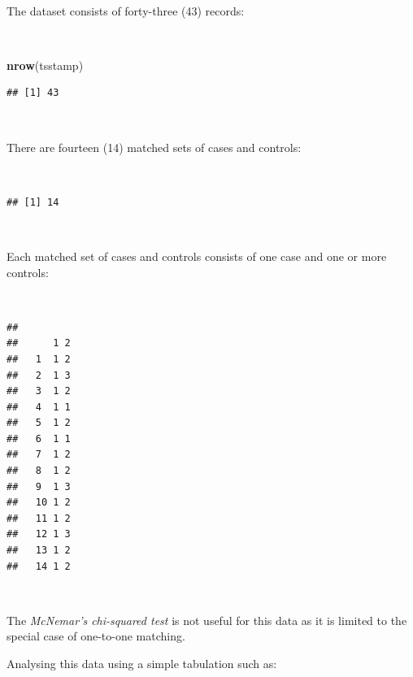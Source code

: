 \documentclass[12pt,a4paper]{book}
\newenvironment{Shaded}{\begin{snugshade}}{\end{snugshade}}
\newcommand{\KeywordTok}[1]{\textcolor[rgb]{0.13,0.29,0.53}{\textbf{#1}}}
\newcommand{\NormalTok}[1]{#1}
\newcommand{\OperatorTok}[1]{\textcolor[rgb]{0.81,0.36,0.00}{\textbf{#1}}}
\theoremstyle{definition}
\theoremstyle{definition}
\theoremstyle{definition}
\theoremstyle{remark}
\begin{document}
~

The dataset consists of forty-three (43) records:

~

\begin{Shaded}
\begin{Highlighting}[]
\KeywordTok{nrow}\NormalTok{(tsstamp)}
\end{Highlighting}
\end{Shaded}

\begin{verbatim}
## [1] 43
\end{verbatim}

~

There are fourteen (14) matched sets of cases and controls:

~

\begin{Shaded}
\end{Shaded}

\begin{verbatim}
## [1] 14
\end{verbatim}

~

Each matched set of cases and controls consists of one case and one or
more controls:

~

\begin{Shaded}
\end{Shaded}

\begin{verbatim}
##     
##      1 2
##   1  1 2
##   2  1 3
##   3  1 2
##   4  1 1
##   5  1 2
##   6  1 1
##   7  1 2
##   8  1 2
##   9  1 3
##   10 1 2
##   11 1 2
##   12 1 3
##   13 1 2
##   14 1 2
\end{verbatim}

~

The \emph{McNemar's chi-squared test} is not useful for this data as it
is limited to the special case of one-to-one matching.

Analysing this data using a simple tabulation such as:
\end{document}
